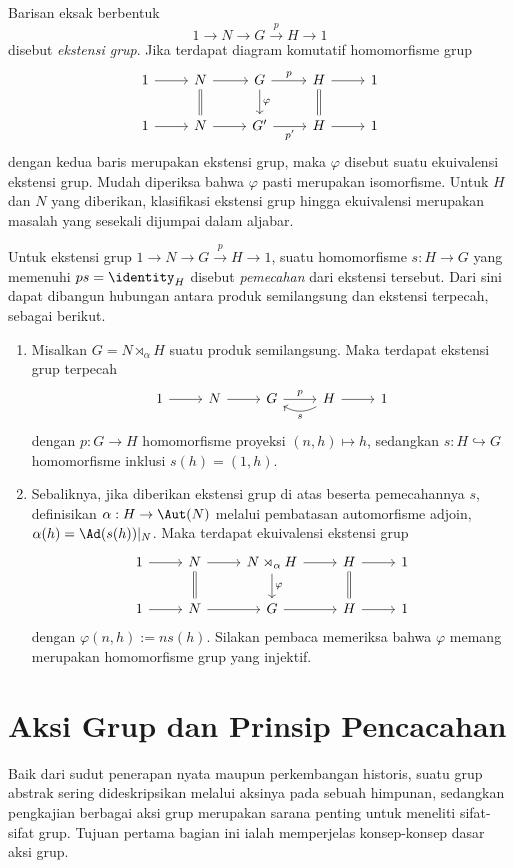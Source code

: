Barisan eksak berbentuk
\[ 1 \to N \to G \xrightarrow{p} H \to 1 \]
disebut \emph{ekstensi grup}. Jika terdapat diagram komutatif homomorfisme grup
\[\begin{tikzcd}
	1 \arrow[r] & N \arrow[r] \arrow[equal, d] & G \arrow[r, "p"] \arrow[d, "\varphi"] & H \arrow[equal, d] \arrow[r] & 1 \\
	1 \arrow[r] & N \arrow[r] & G' \arrow[r, "{p'}"'] & H \arrow[r] & 1
\end{tikzcd}\]
dengan kedua baris merupakan ekstensi grup, maka $\varphi$ disebut suatu ekuivalensi ekstensi grup. Mudah diperiksa bahwa $\varphi$ pasti merupakan isomorfisme. Untuk $H$ dan $N$ yang diberikan, klasifikasi ekstensi grup hingga ekuivalensi merupakan masalah yang sesekali dijumpai dalam aljabar.

Untuk ekstensi grup $1 \to N \to G \xrightarrow{p} H \to 1$, suatu homomorfisme $s: H \to G$ yang memenuhi $p s = \identity_H$ disebut \emph{pemecahan} dari ekstensi tersebut. Dari sini dapat dibangun hubungan antara produk semilangsung dan ekstensi terpecah, sebagai berikut.
\begin{enumerate}
	\item Misalkan $G = N \rtimes_\alpha H$ suatu produk semilangsung. Maka terdapat ekstensi grup terpecah
		\[ \begin{tikzcd}
			1 \arrow[r] & N \arrow[r] & G \arrow[r, "p"] & H \arrow[bend left=30, l, "s"] \arrow[r] & 1
		\end{tikzcd} \]
		dengan $p: G \to H$ homomorfisme proyeksi $(n, h) \mapsto h$, sedangkan $s: H \hookrightarrow G$ homomorfisme inklusi $s(h) = (1,h)$.
	\item Sebaliknya, jika diberikan ekstensi grup di atas beserta pemecahannya $s$, definisikan $\alpha: H \to \Aut(N)$ melalui pembatasan automorfisme adjoin, $\alpha(h) = \Ad(s(h))|_N$. Maka terdapat ekuivalensi ekstensi grup
		\[ \begin{tikzcd}
			1 \arrow[r] & N \arrow[r] \arrow[equal, d] & N \rtimes_\alpha H \arrow[r] \arrow[d, "\varphi"] & H \arrow[equal, d] \arrow[r] & 1 \\
			1 \arrow[r] & N \arrow[r] & G \arrow[r] & H \arrow[r] & 1
		\end{tikzcd} \]
		dengan $\varphi(n, h) := n s(h)$. Silakan pembaca memeriksa bahwa $\varphi$ memang merupakan homomorfisme grup yang injektif.
\end{enumerate}
\section{Aksi Grup dan Prinsip Pencacahan}\label{sec:group-action}
Baik dari sudut penerapan nyata maupun perkembangan historis, suatu grup abstrak sering dideskripsikan melalui aksinya pada sebuah himpunan, sedangkan pengkajian berbagai aksi grup merupakan sarana penting untuk meneliti sifat-sifat grup. Tujuan pertama bagian ini ialah memperjelas konsep-konsep dasar aksi grup.

